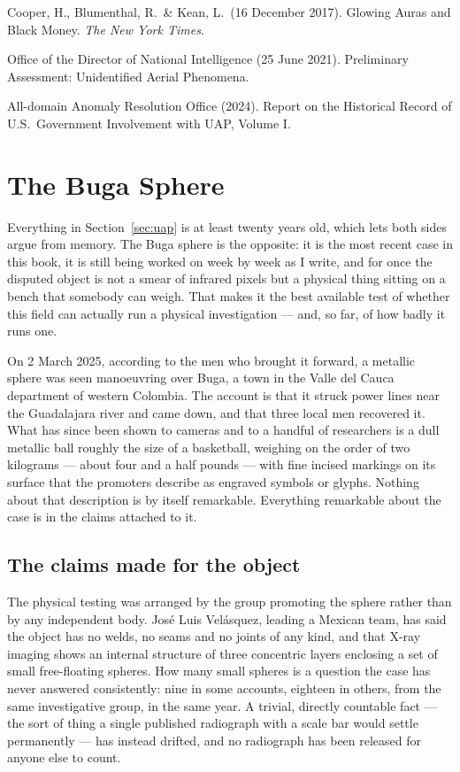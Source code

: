 \begin{srcnotes}
\item Cooper, H., Blumenthal, R.\ \& Kean, L.\ (16 December 2017). Glowing Auras and Black Money.
\emph{The New York Times}.
\item Office of the Director of National Intelligence (25 June 2021). Preliminary Assessment:
Unidentified Aerial Phenomena.
\item All-domain Anomaly Resolution Office (2024). Report on the Historical Record of U.S.\
Government Involvement with UAP, Volume I.
\end{srcnotes}

\section{The Buga Sphere}\label{sec:bugasphere}

Everything in Section~\ref{sec:uap} is at least twenty years old, which lets both sides argue from
memory. The Buga sphere is the opposite: it is the most recent case in this book, it is still being
worked on week by week as I write, and for once the disputed object is not a smear of infrared pixels
but a physical thing sitting on a bench that somebody can weigh. That makes it the best available
test of whether this field can actually run a physical investigation --- and, so far, of how badly it
runs one.

On 2 March 2025, according to the men who brought it forward, a metallic sphere was seen manoeuvring
over Buga, a town in the Valle del Cauca department of western Colombia. The account is that it
struck power lines near the Guadalajara river and came down, and that three local men recovered it.
What has since been shown to cameras and to a handful of researchers is a dull metallic ball roughly
the size of a basketball, weighing on the order of two kilograms --- about four and a half pounds ---
with fine incised markings on its surface that the promoters describe as engraved symbols or glyphs.
Nothing about that description is by itself remarkable. Everything remarkable about the case is in the
claims attached to it.

\subsection{The claims made for the object}

The physical testing was arranged by the group promoting the sphere rather than by any independent
body. Jos\'e Luis Vel\'asquez, leading a Mexican team, has said the object has no welds, no seams and
no joints of any kind, and that X-ray imaging shows an internal structure of three concentric layers
enclosing a set of small free-floating spheres. How many small spheres is a question the case has
never answered consistently: nine in some accounts, eighteen in others, from the same investigative
group, in the same year. A trivial, directly countable fact --- the sort of thing a single published
radiograph with a scale bar would settle permanently --- has instead drifted, and no radiograph has
been released for anyone else to count.

